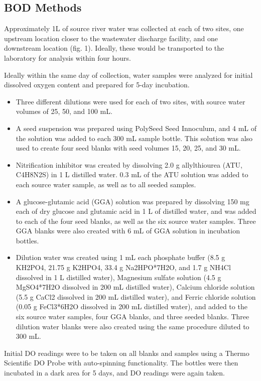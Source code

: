 \documentclass{article}\usepackage[]{graphicx}\usepackage[]{color}
\begin{document}
\subsection{BOD Methods}

Approximately 1L of source river water was collected at each of two sites, one upstream location closer to the wastewater discharge facility, and one downstream location (fig. 1). Ideally, these would be transported to the laboratory for analysis within four hours.

Ideally within the same day of collection, water samples were analyzed for initial dissolved oxygen content and prepared for 5-day incubation.  
\begin{itemize}
  \item Three different dilutions were used for each of two sites, with source water volumes of 25, 50, and 100 mL. 
  \item A seed suspension was prepared using PolySeed Seed Innoculum, and 4 mL of the solution was added to each 300 mL sample bottle. This solution was also used to create four seed blanks with seed volumes 15, 20, 25, and 30 mL.
  \item Nitrification inhibitor was created by dissolving 2.0 g allylthiourea (ATU, C4H8N2S) in 1 L distilled water. 0.3 mL of the ATU solution was added to each source water sample, as well as to all seeded samples. 
  \item A glucose-glutamic acid (GGA) solution was prepared by dissolving 150 mg each of dry glucose and glutamic acid in 1 L of distilled water, and was added to each of the four seed blanks, as well as the six source water samples. Three GGA blanks were also created with 6 mL of GGA solution in incubation bottles. 
  \item Dilution water was created using 1 mL each phosphate buffer (8.5 g KH2PO4, 21.75 g K2HPO4, 33.4 g Na2HPO*7H2O, and 1.7 g NH4Cl dissolved in 1 L distilled water), Magnesium sulfate solution (4.5 g MgSO4*7H2O dissolved in 200 mL distilled water), Calcium chloride solution (5.5 g CaCl2 dissolved in 200 mL distilled water), and Ferric chloride solution (0.05 g FeCl3*6H2O dissolved in 200 mL distilled water), and added to the six source water samples, four GGA blanks, and three seeded blanks. Three dilution water blanks were also created using the same procedure diluted to 300 mL.
\end{itemize}
Initial DO readings were to be taken on all blanks and samples using a Thermo Scientific DO Probe with auto-spinning functionality. The bottles were then incubated in a dark area for 5 days, and DO readings were again taken.  
\end{document}
